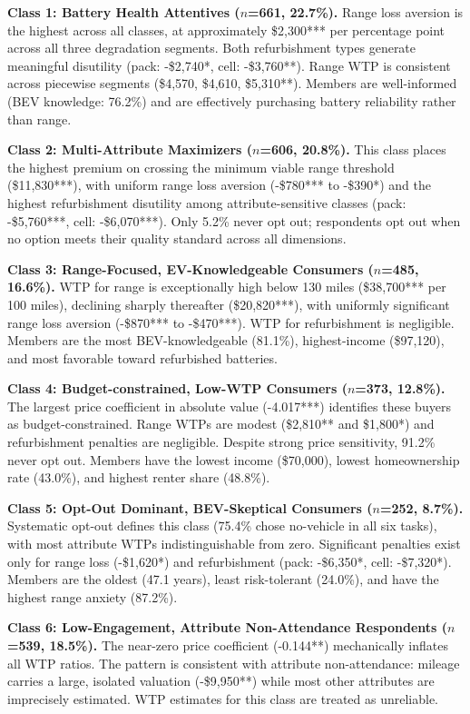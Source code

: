 \documentclass[9pt,a4paper]{extarticle}
\begin{document}
\textbf{Class 1: Battery Health Attentives ($n$=661, 22.7\%).} Range loss aversion is the highest across all classes, at approximately \$2,300*** per percentage point across all three degradation segments. Both refurbishment types generate meaningful disutility (pack: -\$2,740*, cell: -\$3,760**). Range WTP is consistent across piecewise segments (\$4,570, \$4,610, \$5,310**). Members are well-informed (BEV knowledge: 76.2\%) and are effectively purchasing battery reliability rather than range.

\textbf{Class 2: Multi-Attribute Maximizers ($n$=606, 20.8\%).} This class places the highest premium on crossing the minimum viable range threshold (\$11,830***), with uniform range loss aversion (-\$780*** to -\$390*) and the highest refurbishment disutility among attribute-sensitive classes (pack: -\$5,760***, cell: -\$6,070***). Only 5.2\% never opt out; respondents opt out when no option meets their quality standard across all dimensions.

\textbf{Class 3: Range-Focused, EV-Knowledgeable Consumers ($n$=485, 16.6\%).} WTP for range is exceptionally high below 130 miles (\$38,700*** per 100 miles), declining sharply thereafter (\$20,820***), with uniformly significant range loss aversion (-\$870*** to -\$470***). WTP for refurbishment is negligible. Members are the most BEV-knowledgeable (81.1\%), highest-income (\$97,120), and most favorable toward refurbished batteries.

\textbf{Class 4: Budget-constrained, Low-WTP Consumers ($n$=373, 12.8\%).} The largest price coefficient in absolute value (-4.017***) identifies these buyers as budget-constrained. Range WTPs are modest (\$2,810** and \$1,800*) and refurbishment penalties are negligible. Despite strong price sensitivity, 91.2\% never opt out. Members have the lowest income (\$70,000), lowest homeownership rate (43.0\%), and highest renter share (48.8\%).

\textbf{Class 5: Opt-Out Dominant, BEV-Skeptical Consumers ($n$=252, 8.7\%).} Systematic opt-out defines this class (75.4\% chose no-vehicle in all six tasks), with most attribute WTPs indistinguishable from zero. Significant penalties exist only for range loss (-\$1,620*) and refurbishment (pack: -\$6,350*, cell: -\$7,320*). Members are the oldest (47.1 years), least risk-tolerant (24.0\%), and have the highest range anxiety (87.2\%).

\textbf{Class 6: Low-Engagement, Attribute Non-Attendance Respondents ($n$=539, 18.5\%).} The near-zero price coefficient (-0.144**) mechanically inflates all WTP ratios. The pattern is consistent with attribute non-attendance: mileage carries a large, isolated valuation (-\$9,950**) while most other attributes are imprecisely estimated. WTP estimates for this class are treated as unreliable.
\end{document}
